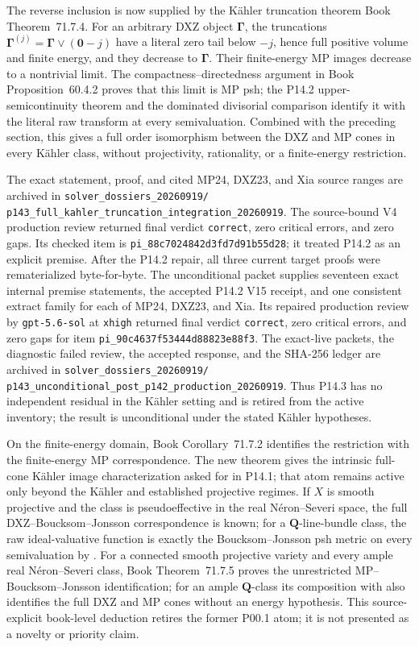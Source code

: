 \documentclass[11pt,a4paper]{article}
\theoremstyle{definition}
\theoremstyle{remark}
\begin{document}
The reverse inclusion is now supplied by the K\"ahler truncation theorem
Book Theorem~71.7.4.  For an arbitrary DXZ object
\(\boldsymbol\Gamma\), the truncations
\(\boldsymbol\Gamma^{(j)}=\boldsymbol\Gamma\vee(\mathbf0-j)\) have a literal
zero tail below \(-j\), hence full positive volume and finite energy, and they
decrease to \(\boldsymbol\Gamma\).  Their finite-energy MP images decrease to
a nontrivial limit.  The compactness--directedness argument in
Book Proposition~60.4.2 proves that this limit is MP psh;
the P14.2 upper-semicontinuity theorem and the dominated divisorial comparison
identify it with the literal raw transform at every
semivaluation.  Combined with the preceding section, this gives a full order
isomorphism between the DXZ and MP cones in every K\"ahler class, without
projectivity, rationality, or a finite-energy restriction.

The exact statement, proof, and cited MP24, DXZ23, and Xia source ranges are
archived in
\nolinkurl{solver_dossiers_20260919/}
\nolinkurl{p143_full_kahler_truncation_integration_20260919}.
The source-bound V4 production review returned final verdict
\texttt{correct}, zero critical errors, and zero gaps.
Its checked item is \nolinkurl{pi_88c7024842d3fd7d91b55d28}; it treated
P14.2 as an explicit premise.  After the P14.2 repair, all three current target proofs were
rematerialized byte-for-byte.  The unconditional packet supplies seventeen
exact internal premise statements, the accepted P14.2 V15 receipt, and one
consistent extract family for each of MP24, DXZ23, and Xia.  Its repaired
production review by \texttt{gpt-5.6-sol} at \texttt{xhigh} returned final
verdict \texttt{correct}, zero critical errors, and zero gaps for item
\nolinkurl{pi_90c4637f53444d88823e88f3}.  The exact-live packets, the diagnostic
failed review, the accepted response, and the SHA-256 ledger are archived in
\nolinkurl{solver_dossiers_20260919/}
\nolinkurl{p143_unconditional_post_p142_production_20260919}.
Thus P14.3 has no independent residual in the K\"ahler setting and is retired
from the active inventory; the result is unconditional under the stated
K\"ahler hypotheses.

On the finite-energy domain,
Book Corollary~71.7.2 identifies the restriction with the
finite-energy MP correspondence.  The new theorem gives the intrinsic
full-cone K\"ahler image characterization asked for in P14.1; that atom
remains active only beyond the K\"ahler and established projective regimes.
If \(X\) is smooth projective and
the class is pseudoeffective
in the real N\'eron--Severi space, the full DXZ--Boucksom--Jonsson
correspondence is known; for a \(\mathbf Q\)-line-bundle class, the raw
ideal-valuative function is exactly the Boucksom--Jonsson psh metric on
every semivaluation by \cite[formula~(3.8) and Theorem~3.12]{Xia23Operations}.
For a connected smooth projective variety and every ample real
N\'eron--Severi class, Book Theorem~71.7.5 proves the
unrestricted MP--Boucksom--Jonsson identification; for an ample
\(\mathbf Q\)-class its composition with \cite[Theorem~3.14]{DXZ23}
also identifies the full DXZ and MP cones without an energy hypothesis.
This source-explicit book-level deduction retires the former P00.1 atom;
it is not presented as a novelty or priority claim.
\end{document}
